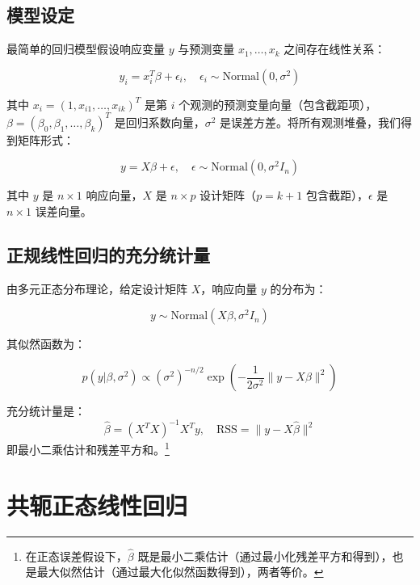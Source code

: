 \subsection{模型设定}

最简单的回归模型假设响应变量 $y$ 与预测变量 $x_1, \ldots, x_k$ 之间存在线性关系：

\begin{equation}
y_i = x_i^T \beta + \epsilon_i, \quad \epsilon_i \sim \text{Normal}(0, \sigma^2)
\label{eq:linear-regression-model}
\end{equation}

其中 $x_i = (1, x_{i1}, \ldots, x_{ik})^T$ 是第 $i$ 个观测的预测变量向量（包含截距项），$\beta = (\beta_0, \beta_1, \ldots, \beta_k)^T$ 是回归系数向量，$\sigma^2$ 是误差方差。将所有观测堆叠，我们得到矩阵形式：

\begin{equation}
y = X\beta + \epsilon, \quad \epsilon \sim \text{Normal}(0, \sigma^2 I_n)
\label{eq:linear-regression-matrix}
\end{equation}

其中 $y$ 是 $n \times 1$ 响应向量，$X$ 是 $n \times p$ 设计矩阵（$p = k+1$ 包含截距），$\epsilon$ 是 $n \times 1$ 误差向量。

\subsection{正规线性回归的充分统计量}

由多元正态分布理论，给定设计矩阵 $X$，响应向量 $y$ 的分布为：

\begin{equation}
y \sim \text{Normal}(X\beta, \sigma^2 I_n)
\label{eq:y-normal}
\end{equation}

其似然函数为：

\begin{equation}
p(y|\beta, \sigma^2) \propto (\sigma^2)^{-n/2} \exp\left(-\frac{1}{2\sigma^2}\|y - X\beta\|^2\right)
\label{eq:likelihood-normal-regression}
\end{equation}

充分统计量是：
\[
\hat{\beta} = (X^TX)^{-1}X^Ty, \quad \text{RSS} = \|y - X\hat{\beta}\|^2
\]
即最小二乘估计和残差平方和。\footnote{在正态误差假设下，$\hat{\beta}$ 既是最小二乘估计（通过最小化残差平方和得到），也是最大似然估计（通过最大化似然函数得到），两者等价。}

\section{共轭正态线性回归}

